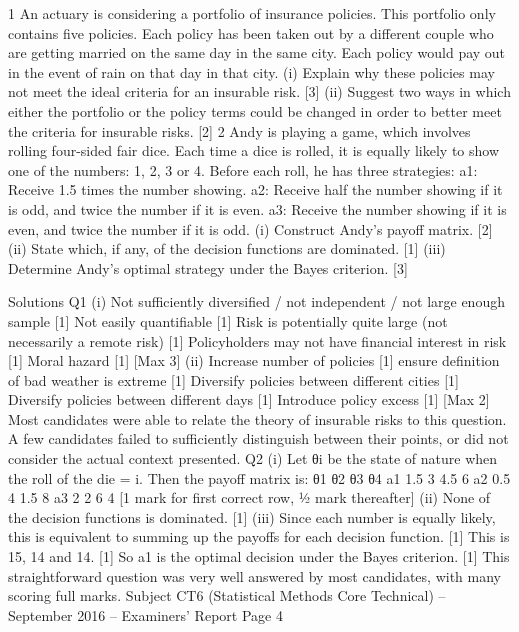 1 An actuary is considering a portfolio of insurance policies. This portfolio only
contains five policies. Each policy has been taken out by a different couple who are
getting married on the same day in the same city. Each policy would pay out in the
event of rain on that day in that city.
(i) Explain why these policies may not meet the ideal criteria for an insurable
risk. [3]
(ii) Suggest two ways in which either the portfolio or the policy terms could be
changed in order to better meet the criteria for insurable risks. [2]
2 Andy is playing a game, which involves rolling four-sided fair dice. Each time a dice
is rolled, it is equally likely to show one of the numbers: 1, 2, 3 or 4.
Before each roll, he has three strategies:
  a1: Receive 1.5 times the number showing.
a2: Receive half the number showing if it is odd, and twice the number if it is even.
a3: Receive the number showing if it is even, and twice the number if it is odd.
(i) Construct Andy’s payoff matrix. [2]
(ii) State which, if any, of the decision functions are dominated. [1]
(iii) Determine Andy’s optimal strategy under the Bayes criterion. [3]

Solutions
Q1 (i) Not sufficiently diversified / not independent / not large enough sample [1]
Not easily quantifiable [1]
Risk is potentially quite large (not necessarily a remote risk) [1]
Policyholders may not have financial interest in risk [1]
Moral hazard [1]
[Max 3]
(ii) Increase number of policies [1]
ensure definition of bad weather is extreme [1]
Diversify policies between different cities [1]
Diversify policies between different days [1]
Introduce policy excess [1]
[Max 2]
Most candidates were able to relate the theory of insurable risks to this
question. A few candidates failed to sufficiently distinguish between their
points, or did not consider the actual context presented.
Q2 (i) Let θi be the state of nature when the roll of the die = i.
Then the payoff matrix is:
  θ1 θ2 θ3 θ4
a1 1.5 3 4.5 6
a2 0.5 4 1.5 8
a3 2 2 6 4
[1 mark for first correct row, ½ mark thereafter]
(ii) None of the decision functions is dominated. [1]
(iii) Since each number is equally likely, this is equivalent to summing up the
payoffs for each decision function. [1]
This is 15, 14 and 14. [1]
So a1 is the optimal decision under the Bayes criterion. [1]
This straightforward question was very well answered by most candidates,
with many scoring full marks.
Subject CT6 (Statistical Methods Core Technical) – September 2016 – Examiners’ Report
Page 4
